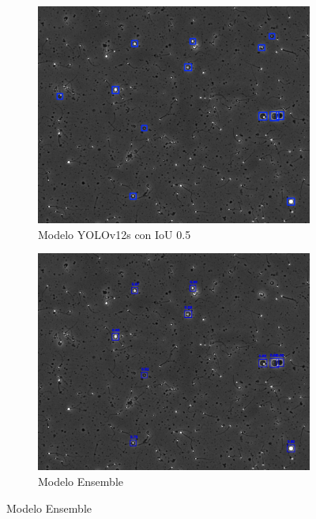 \documentclass[12pt,a4paper,onecolumn,oneside]{report}
\begin{document}
\begin{figure}[H]
  \vspace{0.3cm} 
  
  \begin{subfigure}[b]{0.48\textwidth}
    \centering
    \includegraphics[width=\textwidth]{figuras/evaluacion_cualitativa/95/95_v12.jpg}
    \caption{Modelo YOLOv12s con IoU 0.5}
    \label{fig:yolov12s_IoU0.5_image_95}
  \end{subfigure}
  \hfill
  \begin{subfigure}[b]{0.48\textwidth}
    \centering
    \includegraphics[width=\textwidth]{figuras/evaluacion_cualitativa/95/95_ensemble.jpg}
    \caption{Modelo Ensemble}
    \label{fig:ensemble_image_95}
  \end{subfigure}


\end{figure}
\end{document}
